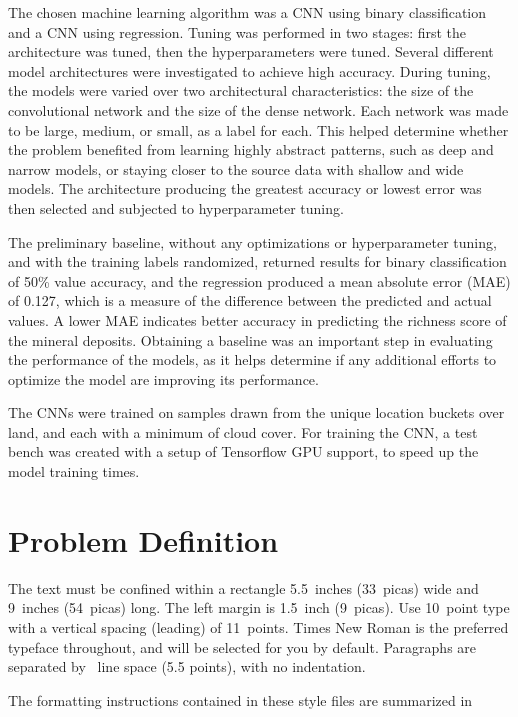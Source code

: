 \documentclass[10pt]{article}
\begin{document}
The chosen machine learning algorithm was a CNN using binary classification and
a CNN using regression. Tuning was performed in two stages: first the
architecture was tuned, then the hyperparameters were tuned. Several different
model architectures were investigated to achieve high accuracy. During tuning,
the models were varied over two architectural characteristics: the size of the
convolutional network and the size of the dense network. Each network was made
to be large, medium, or small, as a label for each. This helped determine
whether the problem benefited from learning highly abstract patterns, such as
deep and narrow models, or staying closer to the source data with shallow and
wide models. The architecture producing the greatest accuracy or lowest error
was then selected and subjected to hyperparameter tuning. 

The preliminary baseline, without any optimizations or hyperparameter tuning,
and with the training labels randomized, returned results for binary
classification of 50\% value accuracy, and the regression produced a mean
absolute error (MAE) of 0.127, which is a measure of the difference between the
predicted and actual values. A lower MAE indicates better accuracy in predicting
the richness score of the mineral deposits. Obtaining a baseline was an
important step in evaluating the performance of the models, as it helps determine
if any additional efforts to optimize the model are improving its performance.

The CNNs were trained on samples drawn from the unique location buckets over
land, and each with a minimum of cloud cover. For training the CNN, a test
bench was created with a setup of Tensorflow GPU support, to speed up the model
training times.

\section{Problem Definition}
\label{gen_inst}

The text must be confined within a rectangle 5.5~inches (33~picas) wide and
9~inches (54~picas) long. The left margin is 1.5~inch (9~picas).  Use 10~point
type with a vertical spacing (leading) of 11~points.  Times New Roman is the
preferred typeface throughout, and will be selected for you by default.
Paragraphs are separated by ~line space (5.5 points), with no
indentation.

The formatting instructions contained in these style files are summarized in
\end{document}
